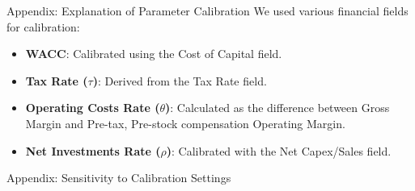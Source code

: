 \documentclass{beamer}
\begin{document}
\begin{frame}{Appendix: Explanation of Parameter Calibration}
  We used various financial fields for calibration:
  \begin{itemize}
    \item \textbf{WACC}: Calibrated using the Cost of Capital field.
    \item \textbf{Tax Rate ($\tau$)}: Derived from the Tax Rate field.
    \item \textbf{Operating Costs Rate ($\theta$)}: Calculated as the difference between Gross Margin and Pre-tax, Pre-stock compensation Operating Margin.
    \item \textbf{Net Investments Rate ($\rho$)}: Calibrated with the Net Capex/Sales field.
  \end{itemize}
\end{frame}


\begin{frame}{Appendix: Sensitivity to Calibration Settings}
  \begin{table}
    \centering
    \small
    \caption{Sensitivity to calibration settings \\ \scriptsize Note: The table compares loss sensitivity to scenarios, models, and horizons. Higher values indicate greater uncertainty from calibration setting choices.}
  \end{table}
\end{frame}




\end{document}
